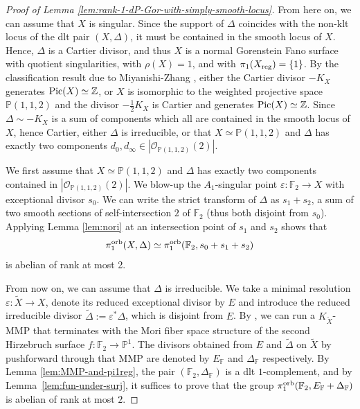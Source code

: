 \documentclass{amsart}
\newcommand{\pp}{\mathbb{P}}
\theoremstyle{definition}
\theoremstyle{remark}
\numberwithin{equation}{section}
\begin{document}
\begin{proof}[Proof of Lemma \ref{lem:rank-1-dP-Gor-with-simply-smooth-locus}]
From here on, we can assume that $X$ is singular. Since the support of $\Delta$ coincides with the non-klt locus of the dlt pair $(X,\Delta)$, it must be contained in the smooth locus of $X$.
Hence, $\Delta$ is a Cartier divisor, and thus $X$ is a normal Gorenstein Fano surface with quotient singularities, with
$\rho(X)=1$, and with $\pi_1(X_{{\rm reg}})=\{1\}$.
By the classification result due to Miyanishi-Zhang \cite[Lemma 6(1)]{MZ88}, either the Cartier divisor $-K_X$ generates ${\rm Pic}(X)\simeq\mathbb{Z}$, or $X$ is isomorphic to the weighted projective space $\mathbb{P}(1,1,2)$ and the divisor $-\frac{1}{2}K_X$ is Cartier and generates ${\rm Pic}(X)\simeq\mathbb{Z}$. Since $\Delta\sim -K_X$ is a sum of components which all are contained in the smooth locus of $X$, hence Cartier, either $\Delta$ is irreducible, or that $X\simeq \mathbb{P}(1,1,2)$ and $\Delta$ has exactly two components $d_0,d_{\infty}\in|\mathcal{O}_{\pp(1,1,2)}(2)|$. 

We first assume that $X\simeq \mathbb{P}(1,1,2)$ and $\Delta$ has exactly two components contained in $|\mathcal{O}_{\pp(1,1,2)}(2)|$. We blow-up the $A_1$-singular point $\varepsilon:\mathbb{F}_2\to X$ with exceptional divisor $s_0$. We can write the strict transform of $\Delta$ as $s_{1}+s_{2}$, a sum of two smooth sections of self-intersection $2$ of $\mathbb{F}_2$ (thus both disjoint from  $s_0$). Applying Lemma \ref{lem:nori} at an intersection point of $s_{1}$ and $s_{2}$ shows that $$\pi_1^{\rm orb}(X,\Delta)\simeq\pi_1^{\rm orb}(\mathbb{F}_2,s_0+s_{1}+s_{2})$$ is abelian of rank at most 2.


From now on, we can assume that $\Delta$ is irreducible. %
We take a minimal resolution $\varepsilon\colon \tilde{X}\rightarrow X$, denote its reduced exceptional divisor by $E$ and introduce the reduced irreducible divisor $\tilde{\Delta}:=\varepsilon^*\Delta$, which is disjoint from $E$. By \cite[Lemma 3]{MZ88}, we can run a $K_{\tilde{X}}$-MMP that terminates with the Mori fiber space structure of the second Hirzebruch surface $f\colon \mathbb{F}_2\rightarrow \pp^1$. The divisors obtained from $E$ and $\tilde{\Delta}$ on $\tilde{X}$ by pushforward through that MMP are denoted by $E_{\mathbb{F}}$ and $\Delta_{\mathbb{F}}$ respectively. By Lemma \ref{lem:MMP-and-pi1reg}, the pair $(\mathbb{F}_2,\Delta_{\mathbb{F}})$ is a dlt $1$-complement, and by Lemma~\ref{lem:fun-under-surj}, it suffices to prove that the group $\pi_1^{\rm orb}(\mathbb{F}_2,E_{\mathbb{F}}+\Delta_{\mathbb{F}})$ is abelian of rank at most $2$.



\end{proof}
\end{document}
